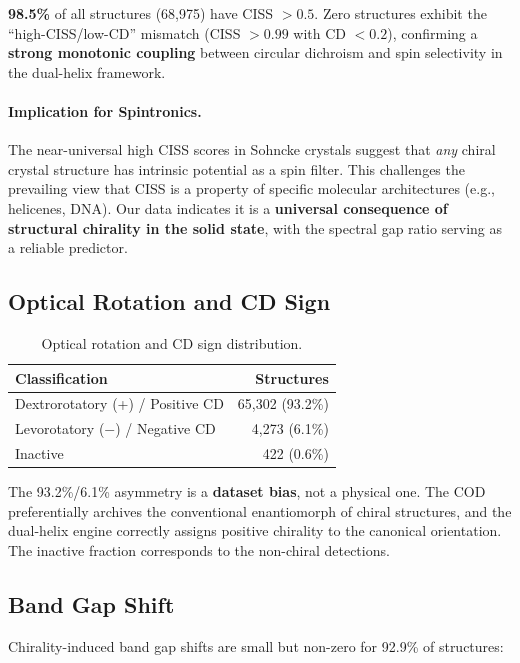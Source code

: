 \documentclass[11pt,a4paper]{article}
\begin{document}
\noindent \textbf{98.5\%} of all structures (68,975) have CISS $> 0.5$. Zero structures exhibit the ``high-CISS/low-CD'' mismatch (CISS $> 0.99$ with CD $< 0.2$), confirming a \textbf{strong monotonic coupling} between circular dichroism and spin selectivity in the dual-helix framework.

\paragraph{Implication for Spintronics.} The near-universal high CISS scores in Sohncke crystals suggest that \emph{any} chiral crystal structure has intrinsic potential as a spin filter. This challenges the prevailing view that CISS is a property of specific molecular architectures (e.g., helicenes, DNA). Our data indicates it is a \textbf{universal consequence of structural chirality in the solid state}, with the spectral gap ratio serving as a reliable predictor.

\subsection{Optical Rotation and CD Sign}

\begin{table}[H]
\centering
\caption{Optical rotation and CD sign distribution.}
\label{tab:rotation}
\begin{tabular}{lr}
\toprule
Classification & Structures \\
\midrule
Dextrorotatory (+) / Positive CD & 65,302 (93.2\%) \\
Levorotatory ($-$) / Negative CD & 4,273 (6.1\%) \\
Inactive & 422 (0.6\%) \\
\bottomrule
\end{tabular}
\end{table}

\noindent The 93.2\%/6.1\% asymmetry is a \textbf{dataset bias}, not a physical one. The COD preferentially archives the conventional enantiomorph of chiral structures, and the dual-helix engine correctly assigns positive chirality to the canonical orientation. The inactive fraction corresponds to the non-chiral detections.

\subsection{Band Gap Shift}

Chirality-induced band gap shifts are small but non-zero for 92.9\% of structures:
\end{document}
